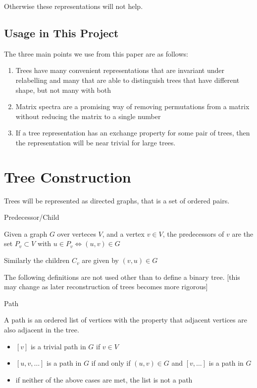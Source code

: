 \documentclass{article}
\begin{document}
Otherwise these representations will not help.

\subsection{Usage in This Project}

The three main points we use from this paper are as follows:
\begin{enumerate}
	\item Trees have many convenient representations that are invariant under
		relabelling and many that are able to distinguish trees that have
		different shape, but not many with both
	\item Matrix spectra are a promising way of removing permutations from a
		matrix without reducing the matrix to a single number
	\item If a tree representation has an exchange property for some pair of
		trees, then the representation will be near trivial for large trees.
\end{enumerate}

\section{Tree Construction}

Trees will be represented as directed graphs, that is a set of ordered pairs.

\begin{definition} Predecessor/Child

	Given a graph $G$ over verteces $V$, and a vertex $v \in V$, the
	predecessors of $v$ are the set $P_v \subset V$ with $u \in P_v
	\Leftrightarrow (u, v) \in G$

	Similarly the children $C_v$ are given by $(v, u) \in G$
\end{definition}

The following definitions are not used other than to define a binary tree.
[this may change as later reconstruction of trees becomes more rigorous]

\begin{definition} Path

	A path is an ordered list of vertices with the property that adjacent
	vertices are also adjacent in the tree.

	\begin{itemize}
		\item $[v]$ is a trivial path in $G$ if $v \in V$
		\item $[u, v, \ldots]$ is a path in $G$ if and only if $(u, v) \in G$
			and $[v, \ldots]$ is a path in $G$
		\item if neither of the above cases are met, the list is not a path
	\end{itemize}
\end{definition}
\end{document}
